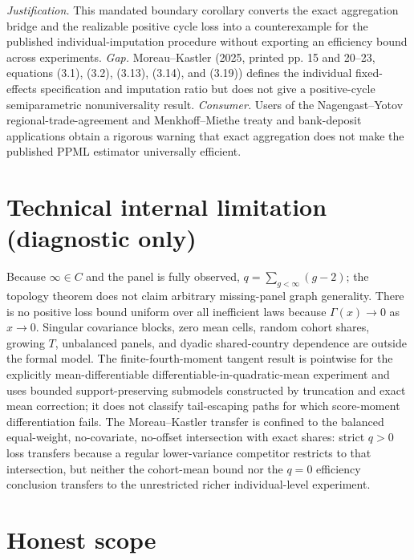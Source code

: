 \documentclass{article}
\begin{document}
\par\smallskip\noindent \textit{Justification.} This mandated boundary corollary converts the exact aggregation bridge and the realizable positive cycle loss into a counterexample for the published individual-imputation procedure without exporting an efficiency bound across experiments. \textit{Gap.} Moreau--Kastler (2025, printed pp. 15 and 20--23, equations (3.1), (3.2), (3.13), (3.14), and (3.19)) defines the individual fixed-effects specification and imputation ratio but does not give a positive-cycle semiparametric nonuniversality result. \textit{Consumer.} Users of the Nagengast--Yotov regional-trade-agreement and Menkhoff--Miethe treaty and bank-deposit applications obtain a rigorous warning that exact aggregation does not make the published PPML estimator universally efficient.

\section*{Technical internal limitation (diagnostic only)}

Because \(\infty\in C\) and the panel is fully observed, \(q=\sum_{g<\infty}(g-2)\); the topology theorem does not claim arbitrary missing-panel graph generality. There is no positive loss bound uniform over all inefficient laws because \(\Gamma(x)\to0\) as \(x\to0\). Singular covariance blocks, zero mean cells, random cohort shares, growing \(T\), unbalanced panels, and dyadic shared-country dependence are outside the formal model. The finite-fourth-moment tangent result is pointwise for the explicitly mean-differentiable differentiable-in-quadratic-mean experiment and uses bounded support-preserving submodels constructed by truncation and exact mean correction; it does not classify tail-escaping paths for which score-moment differentiation fails. The Moreau--Kastler transfer is confined to the balanced equal-weight, no-covariate, no-offset intersection with exact shares: strict \(q>0\) loss transfers because a regular lower-variance competitor restricts to that intersection, but neither the cohort-mean bound nor the \(q=0\) efficiency conclusion transfers to the unrestricted richer individual-level experiment.

\section{Honest scope}
\end{document}
